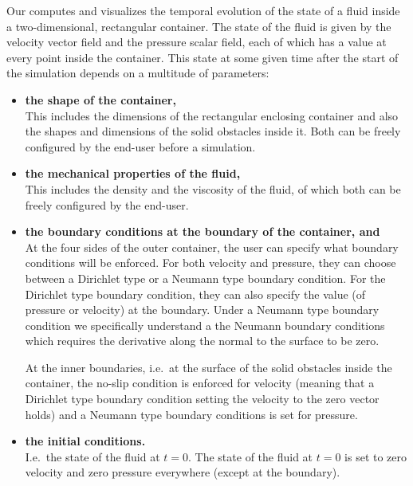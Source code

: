 \documentclass[11pt,a4paper,twoside,openright]{report}
\begin{document}
Our \software{} computes and visualizes the temporal evolution of the state of a fluid inside a two-dimensional, rectangular container. The state of the fluid is given by the velocity vector field and the pressure scalar field, each of which has a value at every point inside the container. This state at some given time after the start of the simulation depends on a multitude of parameters:
\begin{itemize}
	\item \textbf{the shape of the container,}\\
		This includes the dimensions of the rectangular enclosing container and also the shapes and dimensions of the solid obstacles inside it. Both can be freely configured by the end-user before a simulation.
	\item \textbf{the mechanical properties of the fluid,}\\
		This includes the density and the viscosity of the fluid, of which both can be freely configured by the end-user.
	\item \textbf{the boundary conditions at the boundary of the container, and}\\
		At the four sides of the outer container, the user can specify what boundary conditions will be enforced. For both velocity and pressure, they can choose between a Dirichlet type or a Neumann type boundary condition. For the Dirichlet type boundary condition, they can also specify the value (of pressure or velocity) at the boundary. Under a Neumann type boundary condition we specifically understand a the Neumann boundary conditions which requires the derivative along the normal to the surface to be zero.
		\vxlisp

		At the inner boundaries, i.e.\ at the surface of the solid obstacles inside the container, the no-slip condition is enforced for velocity (meaning that a Dirichlet type boundary condition setting the velocity to the zero vector holds) and a Neumann type boundary conditions is set for pressure.
	\item \textbf{the initial conditions.}\\
		I.e.\ the state of the fluid at $t=0$. The state of the fluid at $t=0$ is set to zero velocity and zero pressure everywhere (except at the boundary).
\end{itemize}
\end{document}
